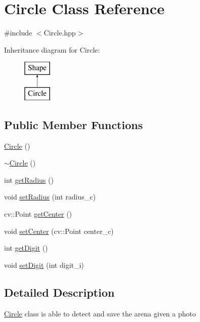 \hypertarget{class_circle}{}\section{Circle Class Reference}
\label{class_circle}


{\ttfamily \#include $<$Circle.\+hpp$>$}

Inheritance diagram for Circle\+:\begin{figure}[H]
\begin{center}
\leavevmode
\includegraphics[height=2.000000cm]{class_circle}
\end{center}
\end{figure}
\subsection*{Public Member Functions}
\begin{DoxyCompactItemize}
\item 
\mbox{\hyperlink{class_circle_ad1ecfcfc7bf34529c6a6d6c448bf70fe}{Circle}} ()
\item 
\mbox{\hyperlink{class_circle_ae3f30436e645d73e368e8ee55f8d1650}{$\sim$\+Circle}} ()
\item 
int \mbox{\hyperlink{class_circle_adfc2e5e026f5d80215563cc42260a237}{get\+Radius}} ()
\item 
void \mbox{\hyperlink{class_circle_ae4a8bd93b437b4cf0077483ff84c8626}{set\+Radius}} (int radius\+\_\+c)
\item 
cv\+::\+Point \mbox{\hyperlink{class_circle_a60d1af499a6ad295f9f2955c4409dddd}{get\+Center}} ()
\item 
void \mbox{\hyperlink{class_circle_a242599150a3623ea837fcb599214e33b}{set\+Center}} (cv\+::\+Point center\+\_\+c)
\item 
int \mbox{\hyperlink{class_circle_a50656c826a70e13fa75eb696a0dd3123}{get\+Digit}} ()
\item 
void \mbox{\hyperlink{class_circle_a187d5c4d66124603abb89f57552b6c4c}{set\+Digit}} (int digit\+\_\+i)
\end{DoxyCompactItemize}


\subsection{Detailed Description}
\mbox{\hyperlink{class_circle}{Circle}} class is able to detect and save the arena given a photo 


